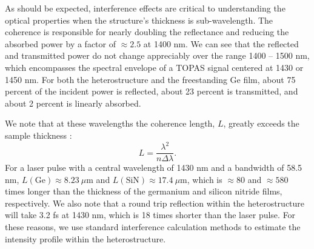 As should be expected, interference effects are critical to understanding the optical properties when the structure's thickness is sub-wavelength. The coherence is responsible for nearly doubling the reflectance and reducing the absorbed power by a factor of $\approx 2.5$ at 1400 nm.  We can see that the reflected and transmitted power do not change appreciably over the range {1400 -- 1500 nm}, which encompasses the spectral envelope of a TOPAS signal centered at 1430 or 1450 nm. For both the heterostructure and the freestanding Ge film, about 75 percent of the incident power is reflected, about 23 percent is transmitted, and about 2 percent is linearly absorbed.

We note that at these wavelengths the coherence length, $L$, greatly exceeds the sample thickness \cite{katsidisGeneralTransfermatrixMethod2002}:
\begin{equation}
L = \frac{\lambda^2}{n \Delta \lambda}.
\end{equation}
For a laser pulse with a central wavelength of 1430 nm and a bandwidth of 58.5 nm, $L(\textrm{Ge}) \approx 8.23 \ \mu\textrm{m}$ and $L(\textrm{SiN}) \approx 17.4 \ \mu\textrm{m}$, which is $\approx 80$ and $\approx 580$ times longer than the thickness of the germanium and silicon nitride films, respectively. We also note that a round trip reflection within the heterostructure will take 3.2 fs at 1430 nm, which is 18 times shorter than the laser pulse. For these reasons, we use standard interference calculation methods to estimate the intensity profile within the heterostructure.

